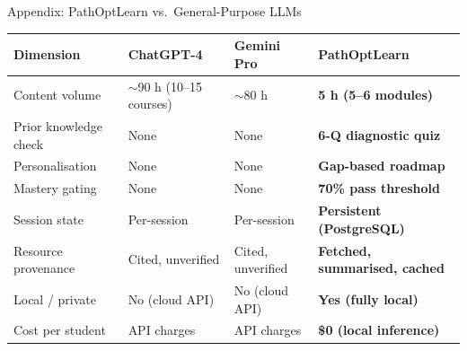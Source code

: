 \documentclass[aspectratio=169,9pt]{beamer}
\begin{document}
\begin{frame}{Appendix: PathOptLearn vs.\ General-Purpose LLMs}
\small
\begin{tabularx}{\textwidth}{@{}lXXX@{}}
  \toprule
  \textbf{Dimension} & \textbf{ChatGPT-4} & \textbf{Gemini Pro} & \textbf{PathOptLearn} \\
  \midrule
  Content volume      & $\sim$90 h (10--15 courses) & $\sim$80 h & \textbf{5 h (5--6 modules)} \\
  Prior knowledge check & None & None & \textbf{6-Q diagnostic quiz} \\
  Personalisation     & None & None & \textbf{Gap-based roadmap} \\
  Mastery gating      & None & None & \textbf{70\% pass threshold} \\
  Session state       & Per-session & Per-session & \textbf{Persistent (PostgreSQL)} \\
  Resource provenance & Cited, unverified & Cited, unverified & \textbf{Fetched, summarised, cached} \\
  Local / private     & No (cloud API) & No (cloud API) & \textbf{Yes (fully local)} \\
  Cost per student    & API charges & API charges & \textbf{\$0 (local inference)} \\
  \bottomrule
\end{tabularx}
\end{frame}
\end{document}
